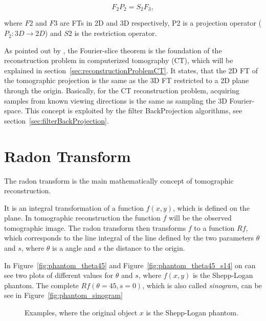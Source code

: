 \begin{equation}
    \label{eq:Fourrier-slice}
    F_2 P_2 = S_2 F_3,
\end{equation}

where $F2$ and $F3$ are FTs in 2D and 3D respectively, P2 is a projection operator ($P_2 : 3D \rightarrow 2D$) and $S2$ is the restriction operator.

As pointed out by \cite{cryoEmMath},
the Fourier-slice theorem is the foundation of the reconstruction problem in computerized tomography (CT), which will be explained in section~\ref{sec:reconstructionProblemCT}.
It states, that the 2D FT of the tomographic projection is the same as the 3D FT restricted to a 2D plane through the origin.
Basically, for the CT reconstruction problem, acquiring samples from known viewing directions is the same 
as sampling the 3D Fourier-space. This concept is exploited by the filter BackProjection algorithms, see section~\ref{sec:filterBackProjection}.

\section{Radon Transform}
The radon transform\cite{radonTransform} is the main mathematically concept of tomographic reconstruction.

It is an integral transformation of a function $f(x,y)$, which is defined on the plane. In tomographic reconstruction
the function $f$ will be the observed tomographic image.
The radon transform then transforms $f$ to a function $Rf$, which corresponds to the line integral of the line defined by 
the two parameters $\theta$ and $s$, where $\theta$ is a angle and $s$ the distance to the origin.

In Figure~\ref{fig:phantom_theta45} and Figure~\ref{fig:phantom_theta45_s14} on can see two plots of different
values for $\theta$ and $s$, where $f(x,y)$ is the Shepp-Logan phantom. The complete $Rf(\theta=45, s=0)$, 
which is also called \textit{sinogram}, can be see in Figure~\ref{fig:phantom_sinogram}

\begin{figure}[H]
    \centering
    \caption{Examples, where the original object $x$ is the Shepp-Logan phantom.}
\end{figure}